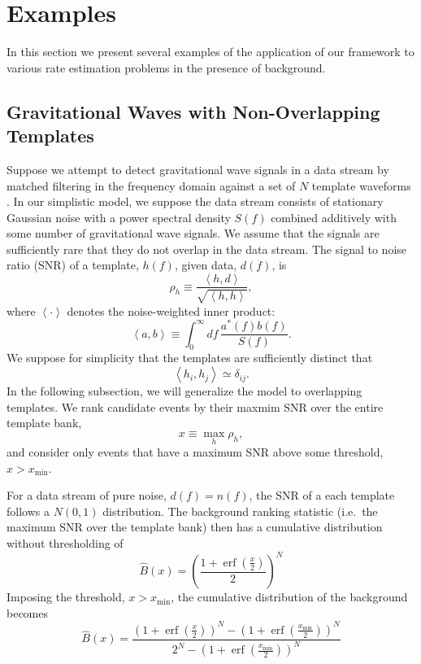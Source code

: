 \documentclass[aps,prd]{revtex4-1}
\newcommand{\xmin}{x_\mathrm{min}}
\DeclareMathOperator{\erf}{erf}
\begin{document}
\section{Examples}
\label{sec:GW-example}

In this section we present several examples of the application of our
framework to various rate estimation problems in the presence of
background.

\subsection{Gravitational Waves with Non-Overlapping Templates}
\label{sec:analytic-GW-example}

Suppose we attempt to detect gravitational wave signals in a data
stream by matched filtering in the frequency domain against a set of
$N$ template waveforms \citep[e.g.][]{LVC2011}.  In our simplistic
model, we suppose the data stream consists of stationary Gaussian
noise with a power spectral density $S(f)$ combined additively with
some number of gravitational wave signals.  We assume that the signals
are sufficiently rare that they do not overlap in the data stream.
The signal to noise ratio (SNR) of a template, $h(f)$, given data,
$d(f)$, is
\begin{equation}
  \rho_h \equiv \frac{\left\langle h, d \right\rangle}{\sqrt{\left
        \langle h, h \right\rangle}},
\end{equation}
where $\left \langle \cdot \right\rangle$ denotes the noise-weighted
inner product:
\begin{equation}
  \left\langle a, b \right\rangle \equiv \int_0^\infty df\,
  \frac{a^*(f) b(f)}{S(f)}.
\end{equation}
We suppose for simplicity that the templates are sufficiently distinct
that 
\begin{equation}
  \left\langle h_i, h_j \right\rangle \simeq \delta_{ij}.
\end{equation}
In the following subsection, we will generalize the model to
overlapping templates.  We rank candidate events by their maxmim SNR
over the entire template bank,
\begin{equation}
  x \equiv \max_{h} \rho_h,
\end{equation}
and consider only events that have a maximum SNR above some threshold,
$x > \xmin$.

For a data stream of pure noise, $d(f) = n(f)$, the SNR of a each
template follows a $N(0,1)$ distribution.  The background ranking
statistic (i.e.\ the maximum SNR over the template bank) then has a
cumulative distribution without thresholding of
\begin{equation}
  \hat{B}(x) = \left( \frac{1 + \erf\left( \frac{x}{2}
      \right)}{2} \right)^N
\end{equation}
Imposing the threshold, $x > \xmin$, the
cumulative distribution of the background becomes
\begin{equation}
  \label{eq:analytic-background-rate}
  \hat{B}(x) = \frac{\left( 1 + \erf\left( \frac{x}{2} \right)
    \right)^N - \left( 1 + \erf\left( \frac{\xmin}{2} \right)
    \right)^N}{2^N - \left( 1 + \erf\left( \frac{\xmin}{2} \right)
    \right)^N }
\end{equation}
\end{document}
